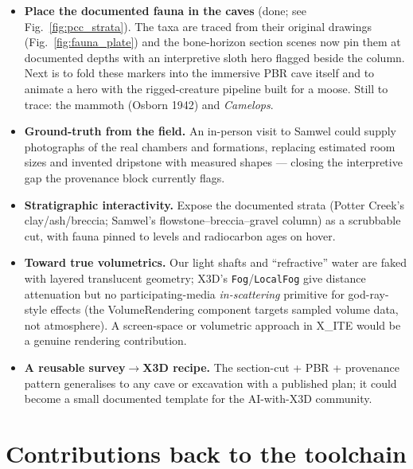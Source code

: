 \documentclass[11pt]{article}
\newcommand{\xite}{X\_ITE}
\begin{document}
\begin{itemize}[leftmargin=1.4em]
\item \textbf{Place the documented fauna in the caves} (done; see
Fig.~\ref{fig:pcc_strata}). The taxa are traced from their original drawings
(Fig.~\ref{fig:fauna_plate}) and the bone-horizon section scenes now pin them at
documented depths with an interpretive sloth hero flagged beside the column. Next
is to fold these markers into the immersive PBR cave itself and to animate a hero
with the rigged-creature pipeline built for a moose. Still to trace: the mammoth
(Osborn 1942) and \emph{Camelops}.
\item \textbf{Ground-truth from the field.} An in-person visit to Samwel could
supply photographs of the real chambers and formations, replacing estimated room
sizes and invented dripstone with measured shapes --- closing the interpretive gap
the provenance block currently flags.
\item \textbf{Stratigraphic interactivity.} Expose the documented strata (Potter
Creek's clay/ash/breccia; Samwel's flowstone--breccia--gravel column) as a
scrubbable cut, with fauna pinned to levels and radiocarbon ages on hover.
\item \textbf{Toward true volumetrics.} Our light shafts and ``refractive'' water
are faked with layered translucent geometry; X3D's \texttt{Fog}/\texttt{LocalFog}
give distance attenuation but no participating-media \emph{in-scattering}
primitive for god-ray-style effects (the VolumeRendering component targets sampled
volume data, not atmosphere). A screen-space or volumetric approach in
\xite{} would be a genuine rendering contribution.
\item \textbf{A reusable survey$\rightarrow$X3D recipe.} The section-cut + PBR +
provenance pattern generalises to any cave or excavation with a published plan;
it could become a small documented template for the AI-with-X3D community.
\end{itemize}

\section{Contributions back to the toolchain}
\end{document}
